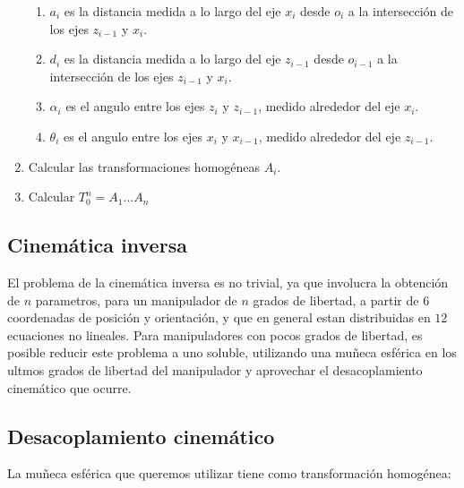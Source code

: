 \begin{multicols*}{3}
\begin{enumerate}
                \begin{enumerate}
                    \item $a_i$ es la distancia medida a lo largo del eje $x_i$ desde $o_i$ a la intersección de los ejes $z_{i-1}$ y $x_i$.
                    \item $d_i$ es la distancia medida a lo largo del eje $z_{i-1}$ desde $o_{i-1}$ a la intersección de los ejes $z_{i-1}$ y $x_i$.
                    \item $\alpha_i$ es el angulo entre los ejes $z_i$ y $z_{i-1}$, medido alrededor del eje $x_i$.
                    \item $\theta_i$ es el angulo entre los ejes $x_i$ y $x_{i-1}$, medido alrededor del eje $z_{i-1}$.
                \end{enumerate}
                \item Calcular las transformaciones homogéneas $A_i$.
                \item Calcular $T_0^n = A_1 \dots A_n$
            \end{enumerate}


        \subsection{Cinemática inversa}

            El problema de la cinemática inversa es no trivial, ya que involucra la obtención de $n$ parametros, para un manipulador de $n$ grados de libertad, a partir de $6$ coordenadas de posición y orientación, y que en general estan distribuidas en $12$ ecuaciones no lineales. Para manipuladores con pocos grados de libertad, es posible reducir este problema a uno soluble, utilizando una muñeca esférica en los ultmos grados de libertad del manipulador y aprovechar el desacoplamiento cinemático que ocurre.


        \subsection{Desacoplamiento cinemático}

            La muñeca esférica que queremos utilizar tiene como transformación homogénea:


\end{multicols*}
